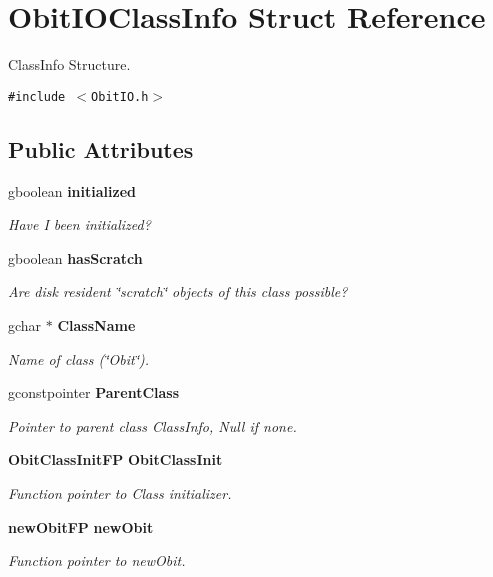\section{Obit\-IOClass\-Info Struct Reference}
\label{structObitIOClassInfo}
Class\-Info Structure.  


{\tt \#include $<$Obit\-IO.h$>$}

\subsection*{Public Attributes}
\begin{CompactItemize}
\item 
gboolean {\bf initialized}
\begin{CompactList}\small\item\em Have I been initialized? \item\end{CompactList}\item 
gboolean {\bf has\-Scratch}
\begin{CompactList}\small\item\em Are disk resident \char`\"{}scratch\char`\"{} objects of this class possible? \item\end{CompactList}\item 
gchar $\ast$ {\bf Class\-Name}
\begin{CompactList}\small\item\em Name of class (\char`\"{}Obit\char`\"{}). \item\end{CompactList}\item 
gconstpointer {\bf Parent\-Class}
\begin{CompactList}\small\item\em Pointer to parent class Class\-Info, Null if none. \item\end{CompactList}\item 
{\bf Obit\-Class\-Init\-FP} {\bf Obit\-Class\-Init}
\begin{CompactList}\small\item\em Function pointer to Class initializer. \item\end{CompactList}\item 
{\bf new\-Obit\-FP} {\bf new\-Obit}
\begin{CompactList}\small\item\em Function pointer to new\-Obit. \item\end{CompactList}\item 

\end{CompactItemize}
